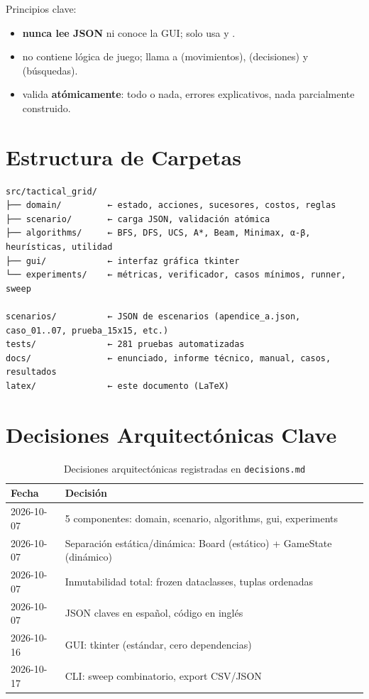 Principios clave:
\begin{itemize}
\item {} \textbf{nunca lee JSON} ni conoce la GUI; solo usa  y .
\item {} no contiene lógica de juego; llama a  (movimientos),  (decisiones) y  (búsquedas).
\item {} valida \textbf{atómicamente}: todo o nada, errores explicativos, nada parcialmente construido.
\end{itemize}

\section{Estructura de Carpetas}
\label{sec:estructura-carpetas}

\begin{verbatim}
src/tactical_grid/
├── domain/         ← estado, acciones, sucesores, costos, reglas
├── scenario/       ← carga JSON, validación atómica
├── algorithms/     ← BFS, DFS, UCS, A*, Beam, Minimax, α-β, heurísticas, utilidad
├── gui/            ← interfaz gráfica tkinter
└── experiments/    ← métricas, verificador, casos mínimos, runner, sweep

scenarios/          ← JSON de escenarios (apendice_a.json, caso_01..07, prueba_15x15, etc.)
tests/              ← 281 pruebas automatizadas
docs/               ← enunciado, informe técnico, manual, casos, resultados
latex/              ← este documento (LaTeX)
\end{verbatim}

\section{Decisiones Arquitectónicas Clave}
\label{sec:decisiones-arquitectonicas}

\begin{table}[H]
\centering
\caption{Decisiones arquitectónicas registradas en \texttt{decisions.md}}
\begin{tabular}{ll}
\toprule
\textbf{Fecha} & \textbf{Decisión} \\
\midrule
2026-10-07 & 5 componentes: domain, scenario, algorithms, gui, experiments \\
2026-10-07 & Separación estática/dinámica: Board (estático) + GameState (dinámico) \\
2026-10-07 & Inmutabilidad total: frozen dataclasses, tuplas ordenadas \\
2026-10-07 & JSON claves en español, código en inglés \\
2026-10-16 & GUI: tkinter (estándar, cero dependencias) \\
2026-10-17 & CLI: sweep combinatorio, export CSV/JSON \\
\bottomrule
\end{tabular}
\label{tab:decisiones-arq}
\end{table}